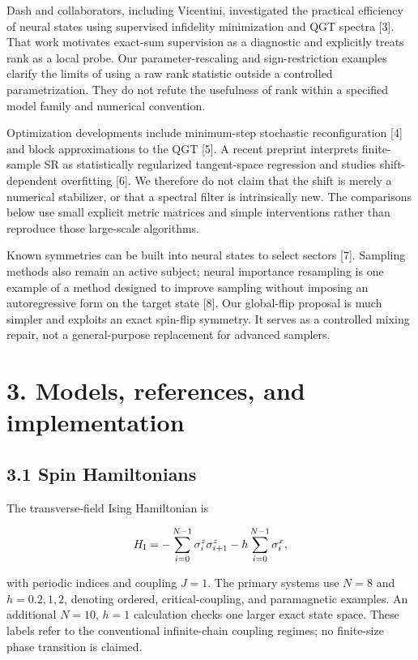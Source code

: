 \documentclass[
  11pt,
  a4paper,
]{article}
\begin{document}
Dash and collaborators, including Vicentini, investigated the practical
efficiency of neural states using supervised infidelity minimization and
QGT spectra {[}3{]}. That work motivates exact-sum supervision as a
diagnostic and explicitly treats rank as a local probe. Our
parameter-rescaling and sign-restriction examples clarify the limits of
using a raw rank statistic outside a controlled parametrization. They do
not refute the usefulness of rank within a specified model family and
numerical convention.

Optimization developments include minimum-step stochastic
reconfiguration {[}4{]} and block approximations to the QGT {[}5{]}. A
recent preprint interprets finite-sample SR as statistically regularized
tangent-space regression and studies shift-dependent overfitting
{[}6{]}. We therefore do not claim that the shift is merely a numerical
stabilizer, or that a spectral filter is intrinsically new. The
comparisons below use small explicit metric matrices and simple
interventions rather than reproduce those large-scale algorithms.

Known symmetries can be built into neural states to select sectors
{[}7{]}. Sampling methods also remain an active subject; neural
importance resampling is one example of a method designed to improve
sampling without imposing an autoregressive form on the target state
{[}8{]}. Our global-flip proposal is much simpler and exploits an exact
spin-flip symmetry. It serves as a controlled mixing repair, not a
general-purpose replacement for advanced samplers.

\hypertarget{models-references-and-implementation}{%
\section{3. Models, references, and
implementation}\label{models-references-and-implementation}}

\hypertarget{spin-hamiltonians}{%
\subsection{3.1 Spin Hamiltonians}\label{spin-hamiltonians}}

The transverse-field Ising Hamiltonian is

\[H_{\rm I}=-\sum_{i=0}^{N-1}\sigma_i^z\sigma_{i+1}^z-h\sum_{i=0}^{N-1}\sigma_i^x,\]

with periodic indices and coupling \(J=1\). The primary systems use
\(N=8\) and \(h=0.2,1,2\), denoting ordered, critical-coupling, and
paramagnetic examples. An additional \(N=10\), \(h=1\) calculation
checks one larger exact state space. These labels refer to the
conventional infinite-chain coupling regimes; no finite-size phase
transition is claimed.
\end{document}
